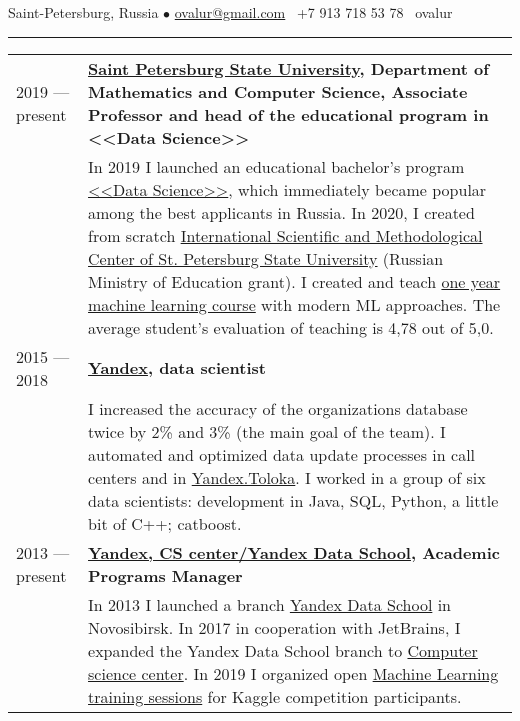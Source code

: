 \documentclass[11pt]{article}
\begin{document}
%

\vspace{0.5em}

\noindent Saint-Petersburg, Russia $\bullet$ \href{mailto:ovalur@gmail.com}{ovalur@gmail.com} \faMobile~+7 913 718 53 78 \faSendO~ovalur

\vspace{0.5em}
\hrule
\vspace{0.5em}

\begin{longtable} {l | p{}}

2019 — present & {\textbf{\href{https://spbu.ru}{Saint Petersburg State University}, Department of Mathematics and Computer Science, Associate Professor and head of the educational program in <<Data Science>>}} \\

& {In 2019 I launched an educational bachelor's program \href{https://maad.compscicenter.ru}{<<Data Science>>}, which immediately became popular among the best applicants in Russia. In 2020, I created from scratch \href{https://gsom.spbu.ru/all_news/event2021-02-04/}{International Scientific and Methodological Center of St. Petersburg State University} (Russian Ministry of Education grant). I created and teach \href{https://github.com/spbu-math-cs/ml-course/}{one year machine learning course} with modern ML approaches. The average student's evaluation of teaching is 4,78 out of 5,0.} \\

2015 — 2018 & {\textbf{\href{https://yandex.ru/}{Yandex}, data scientist}} \\
& {I increased the accuracy of the organizations database twice by 2\% and 3\% (the main goal of the team). I automated and optimized data update processes in call centers and in \href{https://toloka.yandex.ru}{Yandex.Toloka}. I worked in a group of six data scientists: development in Java, SQL, Python, a little bit of C++; catboost.}\\

2013 — present & {\textbf{\href{https://compscicenter.ru}{Yandex, CS center/Yandex Data School}, Academic Programs Manager}} \\
& {In 2013 I launched a branch \href{https://yandexdataschool.ru}{Yandex Data School} in Novosibirsk. In 2017 in cooperation with JetBrains, I expanded the Yandex Data School branch to \href{https://compscicenter.ru}{Computer science center}. In 2019 I organized open \href{https://habr.com/ru/company/JetBrains-education/blog/458042/}{Machine Learning training sessions} for Kaggle competition participants.} \\


\end{longtable}
\end{document}
